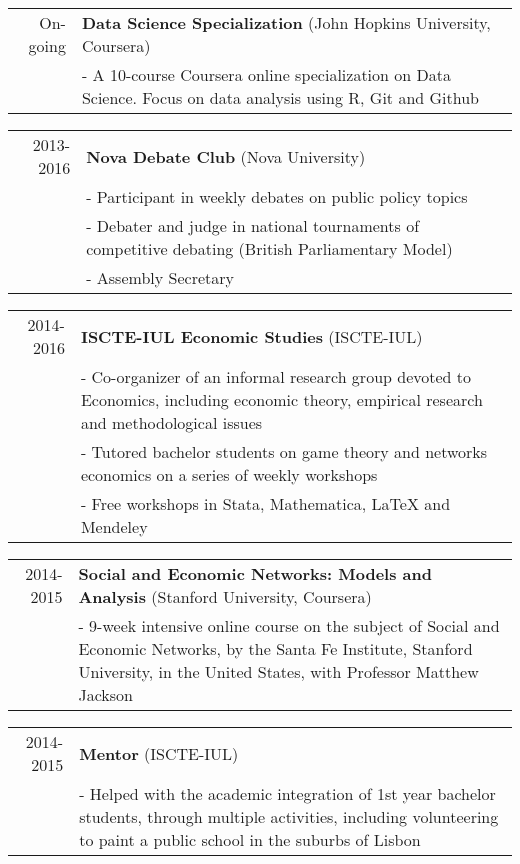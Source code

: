 \documentclass[a4paper,11pt]{article} %
\begin{document}
\begin{tabular}{r|p{13cm}}
	On-going & \textbf{Data Science Specialization} (John Hopkins University, Coursera) \\
	& - A 10-course Coursera online specialization on Data Science. Focus on data analysis using R, Git and Github \\
\end{tabular}

\begin{tabular}{r|p{13cm}}
	2013-2016 & \textbf{Nova Debate Club} (Nova University) \\
	& - Participant in weekly debates on public policy topics \\
	& - Debater and judge in national tournaments of competitive debating (British Parliamentary Model) \\
	& - Assembly Secretary \\
\end{tabular}

\begin{tabular}{r|p{13cm}}
	2014-2016 & \textbf{ISCTE-IUL Economic Studies} (ISCTE-IUL) \\
	& - Co-organizer of an informal research group devoted to Economics, including economic theory, empirical research and methodological issues \\
	& - Tutored bachelor students on game theory and networks economics on a series of weekly workshops \\
	& - Free workshops in Stata, Mathematica, LaTeX and Mendeley \\
\end{tabular}

\begin{tabular}{r|p{13cm}}
	2014-2015 & \textbf{Social and Economic Networks: Models and Analysis} (Stanford University, Coursera) \\
	& - 9-week intensive online course on the subject of Social and Economic Networks, by the Santa Fe Institute, Stanford University, in the United States, with Professor Matthew Jackson \\
\end{tabular}

\begin{tabular}{r|p{13cm}}
	2014-2015 & \textbf{Mentor} (ISCTE-IUL) \\
	& - Helped with the academic integration of 1st year bachelor students, through multiple activities, including volunteering to paint a public school in the suburbs of Lisbon \\
\end{tabular}
\end{document}
